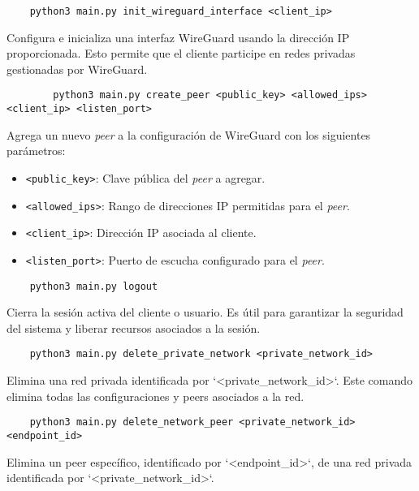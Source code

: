    
    
    \begin{verbatim}
    python3 main.py init_wireguard_interface <client_ip>
    \end{verbatim} 
    Configura e inicializa una interfaz WireGuard usando la dirección IP proporcionada. Esto permite que el cliente participe en redes privadas gestionadas por WireGuard.
    
   
    
    \begin{verbatim}
        python3 main.py create_peer <public_key> <allowed_ips> <client_ip> <listen_port>
    \end{verbatim}
        
    Agrega un nuevo \textit{peer} a la configuración de WireGuard con los siguientes parámetros:  
        \begin{itemize}
            \item \texttt{<public\_key>}: Clave pública del \textit{peer} a agregar.
            \item \texttt{<allowed\_ips>}: Rango de direcciones IP permitidas para el \textit{peer}.
            \item \texttt{<client\_ip>}: Dirección IP asociada al cliente.
            \item \texttt{<listen\_port>}: Puerto de escucha configurado para el \textit{peer}.
        \end{itemize}
        
   
    
    \begin{verbatim}
    python3 main.py logout
    \end{verbatim} 
    Cierra la sesión activa del cliente o usuario. Es útil para garantizar la seguridad del sistema y liberar recursos asociados a la sesión.
    
   
    
    
    \begin{verbatim}
    python3 main.py delete_private_network <private_network_id>
    \end{verbatim} 
    Elimina una red privada identificada por `<private\_network\_id>`. Este comando elimina todas las configuraciones y peers asociados a la red.
    
    \begin{verbatim}
    python3 main.py delete_network_peer <private_network_id> <endpoint_id>
    \end{verbatim} 
    Elimina un peer específico, identificado por `<endpoint\_id>`, de una red privada identificada por `<private\_network\_id>`.
    

